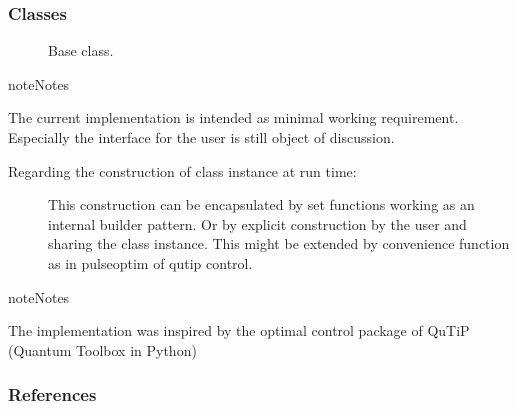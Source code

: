 \documentclass[letterpaper,10pt,english]{sphinxmanual}
\begin{document}
\subsubsection{Classes}
\label{\detokenize{qsim:id30}}\begin{description}
\item[{{\hyperref[\detokenize{qsim:qsim.simulator.Simulator}]{}}}] \leavevmode
Base class.

\end{description}

\begin{sphinxadmonition}{note}{Notes}

The current implementation is intended as minimal working requirement.
Especially the interface for the user is still object of discussion.
\begin{description}
\item[{Regarding the construction of class instance at run time:}] \leavevmode
This construction can be encapsulated by set functions working as an
internal builder pattern.
Or by explicit construction by the user and sharing the class instance.
This might be extended by convenience function as in pulseoptim of qutip
control.

\end{description}
\end{sphinxadmonition}

\begin{sphinxadmonition}{note}{Notes}

The implementation was inspired by the optimal control package of QuTiP 
(Quantum Toolbox in Python)
\end{sphinxadmonition}
\subsubsection*{References}
\end{document}
